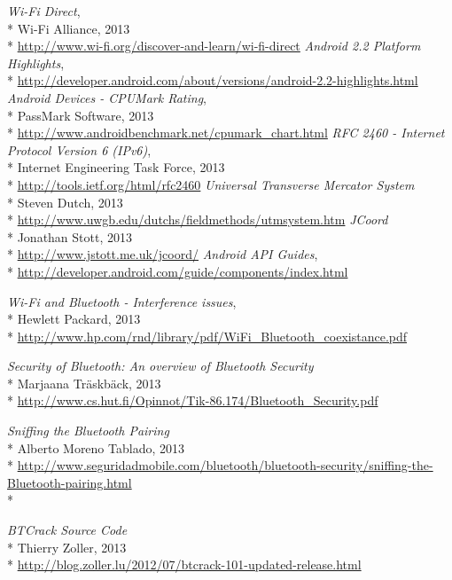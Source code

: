 \begin{thebibliography}{9}

 \emph{Wi-Fi Direct},\\*
 Wi-Fi Alliance, 2013\\*
 \url{http://www.wi-fi.org/discover-and-learn/wi-fi-direct}
 \emph{Android 2.2 Platform Highlights},\\*
 \url{http://developer.android.com/about/versions/android-2.2-highlights.html}
 \emph{Android Devices - CPUMark Rating},\\*
 PassMark Software, 2013\\*
 \url{http://www.androidbenchmark.net/cpumark_chart.html}
 \emph{RFC 2460 - Internet Protocol Version 6 (IPv6)},\\*
 Internet Engineering Task Force, 2013\\*
 \url{http://tools.ietf.org/html/rfc2460}
 \emph{Universal Transverse Mercator System}\\*
 Steven Dutch, 2013\\*
 \url{http://www.uwgb.edu/dutchs/fieldmethods/utmsystem.htm}
 \emph{JCoord}\\*
 Jonathan Stott, 2013\\*
 \url{http://www.jstott.me.uk/jcoord/}
 \emph{Android API Guides},\\*
 \url{http://developer.android.com/guide/components/index.html}

 \emph{Wi-Fi and Bluetooth - Interference issues},\\*
 Hewlett Packard, 2013\\*
 \url{http://www.hp.com/rnd/library/pdf/WiFi_Bluetooth_coexistance.pdf}

  \emph{Security of Bluetooth: An overview of Bluetooth Security}\\*
  Marjaana Träskbäck, 2013\\*
  \url{http://www.cs.hut.fi/Opinnot/Tik-86.174/Bluetooth_Security.pdf}

 \emph{Sniffing the Bluetooth Pairing}\\*
 Alberto Moreno Tablado, 2013\\*
 \url{http://www.seguridadmobile.com/bluetooth/bluetooth-security/sniffing-the-Bluetooth-pairing.html}\\*
 
\emph{BTCrack Source Code}\\*
Thierry Zoller, 2013\\* \url{http://blog.zoller.lu/2012/07/btcrack-101-updated-release.html}
\end{thebibliography}


